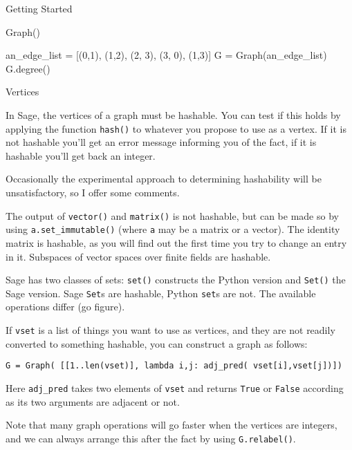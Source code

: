 \begin{chap}{Getting Started}
\begin{sect}{Graph()}
\begin{sagecode}
\begin{sageinput}
an_edge_list = [(0,1), (1,2), (2, 3), (3, 0), (1,3)]
G = Graph(an_edge_list)
G.degree()
\end{sageinput}
\begin{sageoutput}
[2, 3, 2, 3]
\end{sageoutput}
\end{sagecode}
%
\end{sect}
%
\begin{sect}{Vertices}
%
\begin{para}
In Sage, the vertices of a graph must be hashable. You can test if this holds 
by applying the function \verb|hash()| to whatever you propose to use as a vertex.
If it is not hashable you'll get an error message informing you of the fact, if it
is hashable you'll get back an integer.
\end{para}
%
\begin{para}
Occasionally the experimental approach to determining hashability will be 
unsatisfactory, so I offer some comments.
\end{para}
%
\begin{para}
The output of \verb|vector()| and \verb|matrix()| is not hashable, but can
be made so by using \verb|a.set_immutable()| (where \verb|a| may be a matrix
or a vector). The identity matrix is hashable, as you will find out the first 
time you try to change an entry in it. Subspaces of vector
spaces over finite fields are hashable.
\end{para}
%
\begin{para}
Sage has two classes of sets: \verb|set()| constructs the Python version and
\verb|Set()| the Sage version. Sage \verb|Set|s are hashable, Python \verb|set|s are not.
The available operations differ (go figure).
\end{para}
%
\begin{para}
If \verb|vset| is a list of things you want to use as vertices, and they are not 
readily converted to something hashable, you can construct a graph as follows:
\end{para}
%
\begin{para}
\verb|G = Graph( [[1..len(vset)], lambda i,j: adj_pred( vset[i],vset[j])])|
\end{para}
%
\begin{para}
Here \verb|adj_pred| takes two elements of \verb|vset| and returns
\verb|True| or \verb|False| according as its two arguments are adjacent or not.
\end{para}
%
\begin{para}
Note that many graph operations will go faster when the vertices are integers,
and we can always arrange this after the fact by using \verb|G.relabel()|.
\end{para}
%
\end{sect}
%
\end{chap}
